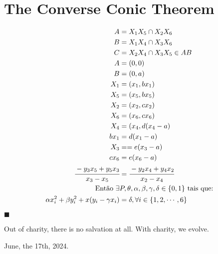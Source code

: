 \newpage

\section{The Converse Conic Theorem}

\begin{align}
    A &= X_1 X_5 \cap X_2 X_6 \\
    B &= X_1 X_4 \cap X_3 X_6 \\
    C &= X_2 X_4 \cap X_3 X_5 \in AB \\
    A &= (0,0) \\
    B &= (0,a) \\
    X_1 &= (x_1, bx_1) \\
    X_5 &= (x_5, bx_5) \\
    X_2 &= (x_2, cx_2) \\
    X_6 &= (x_6, cx_6) \\
    X_4 &= (x_4, d(x_4 - a) \\
    bx_1 &= d(x_1 - a) \\
    X_3 &== e(x_3 - a) \\
    cx_6 &= e(x_6 - a) \\
    \cfrac{-y_3 x_5 + y_5 x_3}{x_3 - x_5} &= \cfrac{-y_2 x_4 + y_4 x_2}{x_2 - x_4} \\
    \text{Então } \exists &P, \theta, \alpha, \beta, \gamma, \delta \in \{0, 1 \}\text{ tais que:} \nonumber \\
    \alpha x_i^2 + \beta y_i^2 + x(y_i - \gamma x_i) &= \delta, \forall i \in \{1, 2, \cdots, 6\}
\end{align}

$\blacksquare$

Out of charity, there is no salvation at all. With charity, we evolve.

June, the 17th, 2024.

%
